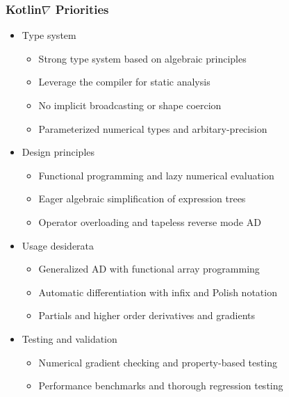 \documentclass{beamer}
\begin{document}
    \begin{frame}
        \frametitle{Kotlin\texorpdfstring{$\nabla$}{} Priorities}
        \begin{itemize}
            \item Type system
            \begin{itemize}
                \item Strong type system based on algebraic principles
                \item Leverage the compiler for static analysis
                \item No implicit broadcasting or shape coercion
                \item Parameterized numerical types and arbitary-precision
            \end{itemize}
            \item Design principles
            \begin{itemize}
                \item Functional programming and lazy numerical evaluation
                \item Eager algebraic simplification of expression trees
                \item Operator overloading and tapeless reverse mode AD
            \end{itemize}
            \item Usage desiderata
            \begin{itemize}
                \item Generalized AD with functional array programming
                \item Automatic differentiation with infix and Polish notation
                \item Partials and higher order derivatives and gradients
            \end{itemize}
            \item Testing and validation
            \begin{itemize}
                \item Numerical gradient checking and property-based testing
                \item Performance benchmarks and thorough regression testing
            \end{itemize}
        \end{itemize}
    \end{frame}
\end{document}
